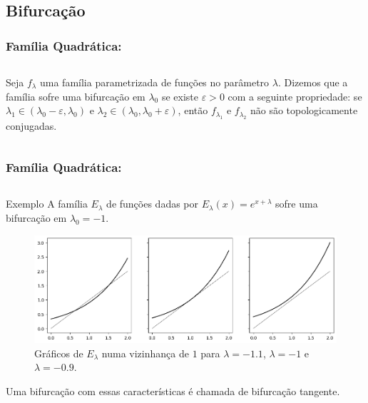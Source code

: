 \subsection{Bifurcação}


\begin{frame}
\vspace{5pt}
\frametitle{Família Quadrática: \subsecname}
\begin{columns}
\column{\dimexpr\paperwidth-15pt}

\begin{definition}
Seja $f_\lambda$ uma família parametrizada de funções no parâmetro $\lambda$. Dizemos que a família sofre uma bifurcação em $\lambda_0$ se existe $\varepsilon > 0$ com a seguinte propriedade: se $\lambda_1 \in (\lambda_0 - \varepsilon, \lambda_0)$ e $\lambda_2 \in (\lambda_0, \lambda_0 + \varepsilon)$, então $f_{\lambda_1}$ e $f_{\lambda_2}$ não são topologicamente conjugadas.
\end{definition}

\end{columns}
\end{frame}


\begin{frame}
\vspace{5pt}
\frametitle{Família Quadrática: \subsecname}
\begin{columns}
\column{\dimexpr\paperwidth-15pt}

\begin{block}{Exemplo}
A família $E_\lambda$ de funções dadas por $E_\lambda(x) = e^{x + \lambda}$ sofre uma bifurcação em $\lambda_0 = -1$.

\vspace{10pt}

\begin{figure}[!htb]
\centering
\includegraphics[scale=0.4]{images/e_lambda.png}
\caption{Gráficos de $E_\lambda$ numa vizinhança de $1$ para $\lambda = -1.1$, $\lambda = -1$ e $\lambda = -0.9$.}
\end{figure}
Uma bifurcação com essas características é chamada de bifurcação tangente.
\end{block}

\end{columns}
\end{frame}

